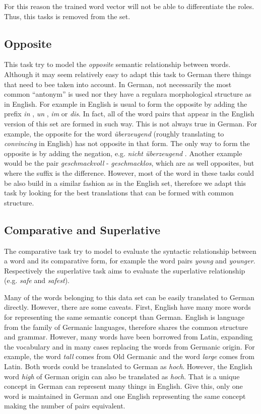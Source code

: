 For this reason the trained word vector will not be able to differentiate the
roles. Thus, this tasks is removed from the set. 

\subsection{Opposite}
\label{sec:sub_sec_opposite}
This task try to model the \emph{opposite} semantic relationship between words.
Although it may seem relatively easy to adapt this task to German there
things that need to bee taken into account. In German,  not necessarily the
most common ``antonym'' is used nor they have a regulara morphological
structure as in English. For example  in English is usual to form the
opposite by adding the prefix \textit{in} ,  \textit{un} , \textit{im} or
\textit{dis}. In fact, all of the word pairs that appear in the English
version of this set are formed in such way. This is not always true in
German. For example, the opposite for the word  \textit{\"{u}berzeugend} (roughly
translating to \emph{convincing} in English) has not opposite in that form.
The only way to form the opposite is by adding the negation, e.g.
\textit{nicht  \"{u}berzeugend }. Another example would be the pair
\textit{geschmackvoll} - \textit{ geschmacklos}, which are as well opposites,
but where the suffix is the difference.
However, most of the word in these tasks could be also build in a similar
fashion as in the English set, therefore we adapt this task by looking for
the best translations that can be formed with common structure.

\subsection{Comparative and Superlative}
\label{sec:sub_sec_comparative_sup}

The comparative task  try to model to evaluate the syntactic relationship between a word
and its comparative form, for example the word pairs  \textit{young} and
\textit{younger}. Respectively the superlative task aims to evaluate the
superlative relationship  (e.g. \textit{safe}  and \textit{safest}). 

Many of the words belonging to this data set can be easily translated to
German directly. However, there are some caveats. First, English have many
more words for representing the same semantic concept than German.  English is language from
the family of Germanic languages, therefore shares the common structure
and grammar. However, many words have been borrowed from Latin, expanding the
vocabulary  and in many cases replacing the words from Germanic origin. 
For example, the word \textit{tall}  comes from Old Germanic and  the
word \textit{large} comes from Latin. Both words could be translated to
German as \textit{hoch}. However, the English word  \textit{high} of German
origin can also be translated as \textit{hoch}.
That is a unique concept in German can represent many things in English. 
Give this, only one word is maintained in German and one English representing
the same concept making the number of pairs equivalent.


